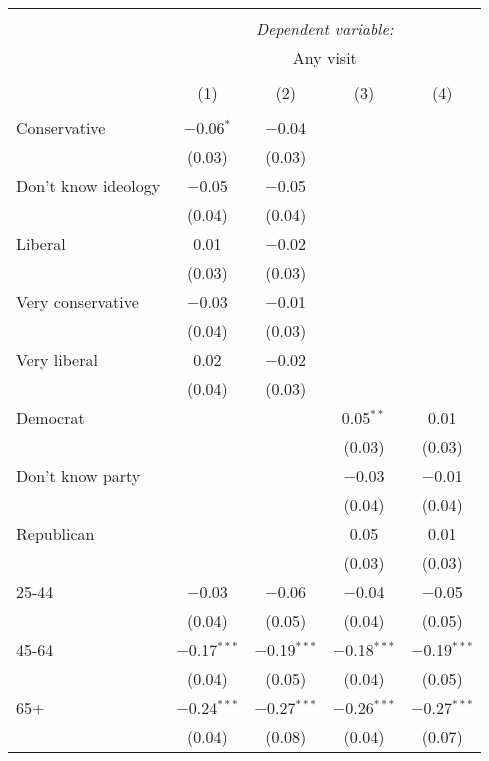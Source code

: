 
\begin{table}[!htbp] \centering 
  \caption{} 
  \label{} 
\small 
\begin{tabular}{@{\extracolsep{5pt}}lcccc} 
\\[-1.8ex]\hline 
\hline \\[-1.8ex] 
 & \multicolumn{4}{c}{\textit{Dependent variable:}} \\ 
\cline{2-5} 
 & \multicolumn{4}{c}{Any visit} \\ 
\\[-1.8ex] & (1) & (2) & (3) & (4)\\ 
\hline \\[-1.8ex] 
 Conservative & $-$0.06$^{*}$ & $-$0.04 &  &  \\ 
  & (0.03) & (0.03) &  &  \\ 
  Don't know ideology & $-$0.05 & $-$0.05 &  &  \\ 
  & (0.04) & (0.04) &  &  \\ 
  Liberal & 0.01 & $-$0.02 &  &  \\ 
  & (0.03) & (0.03) &  &  \\ 
  Very conservative & $-$0.03 & $-$0.01 &  &  \\ 
  & (0.04) & (0.03) &  &  \\ 
  Very liberal & 0.02 & $-$0.02 &  &  \\ 
  & (0.04) & (0.03) &  &  \\ 
  Democrat &  &  & 0.05$^{**}$ & 0.01 \\ 
  &  &  & (0.03) & (0.03) \\ 
  Don't know party &  &  & $-$0.03 & $-$0.01 \\ 
  &  &  & (0.04) & (0.04) \\ 
  Republican &  &  & 0.05 & 0.01 \\ 
  &  &  & (0.03) & (0.03) \\ 
  25-44 & $-$0.03 & $-$0.06 & $-$0.04 & $-$0.05 \\ 
  & (0.04) & (0.05) & (0.04) & (0.05) \\ 
  45-64 & $-$0.17$^{***}$ & $-$0.19$^{***}$ & $-$0.18$^{***}$ & $-$0.19$^{***}$ \\ 
  & (0.04) & (0.05) & (0.04) & (0.05) \\ 
  65+ & $-$0.24$^{***}$ & $-$0.27$^{***}$ & $-$0.26$^{***}$ & $-$0.27$^{***}$ \\ 
  & (0.04) & (0.08) & (0.04) & (0.07) \\ 

\end{tabular}
\end{table}
